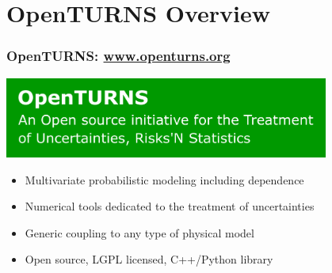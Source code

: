\documentclass{beamer}
\begin{document}
\section{OpenTURNS Overview}


\begin{frame}
\frametitle{OpenTURNS: \url{www.openturns.org}}


    \begin{center}
    \includegraphics[width=0.8\textwidth]{figures/OT.pdf}
    \end{center}
	
\begin{itemize}
\item Multivariate probabilistic modeling including dependence
\item Numerical tools dedicated to the treatment of uncertainties
\item Generic coupling to any type of physical model
\item Open source, LGPL licensed, C++/Python library
\end{itemize}


\end{frame}

\end{document}
